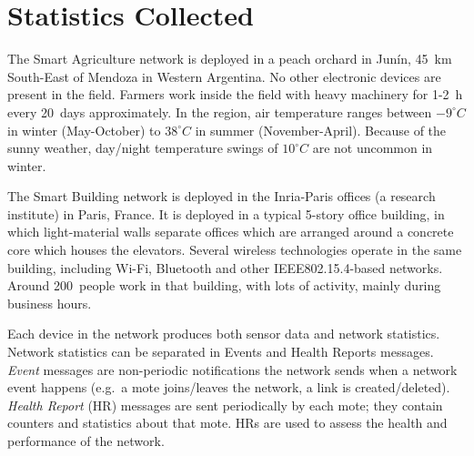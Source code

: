 \documentclass{elsarticle}
\newcommand{\building}            {Smart Building\xspace}
\newcommand{\agri}                {Smart Agriculture\xspace}
\begin{document}
\section{Statistics Collected}
\label{sec:collected}


The \agri network is deployed in a peach orchard in Jun\'in, 45~km South-East of Mendoza in Western Argentina.
No other electronic devices are present in the field.
Farmers work inside the field with heavy machinery for 1-2~h every 20~days approximately.
In the region, air temperature ranges between $-9^{\circ}C$ in winter (May-October) to $38^{\circ}C$ in summer (November-April).
Because of the sunny weather, day/night temperature swings of $10^{\circ}C$ are not uncommon in winter.

The \building network is deployed in the Inria-Paris offices (a research institute) in Paris, France.
It is deployed in a typical 5-story office building, in which light-material walls separate offices which are arranged around a concrete core which houses the elevators.
Several wireless technologies operate in the same building, including Wi-Fi, Bluetooth and other IEEE802.15.4-based networks.
Around 200~people work in that building, with lots of activity, mainly during business hours.


Each device in the network produces both sensor data and network statistics.
Network statistics can be separated in Events and Health Reports messages.
\textit{Event} messages are non-periodic notifications the network sends when a network event happens (e.g.~a mote joins/leaves the network, a link is created/deleted).
\textit{Health Report} (HR) messages are sent periodically by each mote; they contain counters and statistics about that mote.
HRs are used to assess the health and performance of the network.

\end{document}
